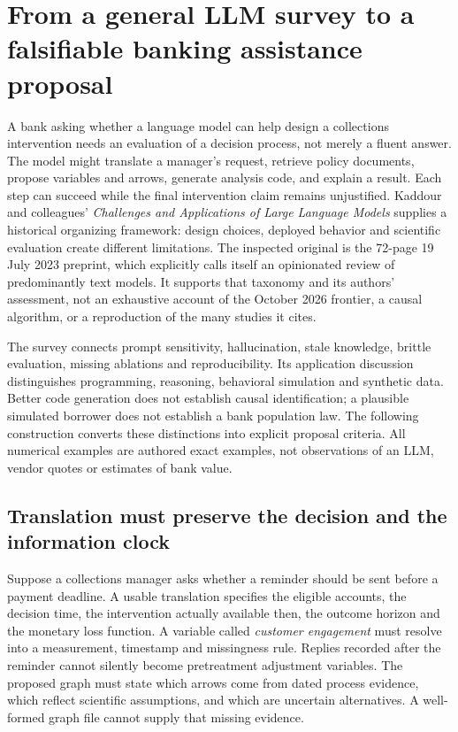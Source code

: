 \section{From a general LLM survey to a falsifiable banking assistance proposal}
\label{sec:exec24-llm-challenges}

A bank asking whether a language model can help design a collections intervention
needs an evaluation of a decision process, not merely a fluent answer. The model
might translate a manager's request, retrieve policy documents, propose variables
and arrows, generate analysis code, and explain a result. Each step can succeed
while the final intervention claim remains unjustified. Kaddour and colleagues'
\emph{Challenges and Applications of Large Language Models} supplies a historical
organizing framework: design choices, deployed behavior and scientific evaluation
create different limitations. The inspected original is the 72-page 19 July 2023
preprint, which explicitly calls itself an opinionated review of predominantly
text models. It supports that taxonomy and its authors' assessment, not an
exhaustive account of the October 2026 frontier, a causal algorithm, or a
reproduction of the many studies it cites.\citep{exec24_llmchallenges_original}

The survey connects prompt sensitivity, hallucination, stale knowledge, brittle
evaluation, missing ablations and reproducibility. Its application discussion
distinguishes programming, reasoning, behavioral simulation and synthetic data.
Better code generation does not establish causal identification; a plausible
simulated borrower does not establish a bank population law. The following
construction converts these distinctions into explicit proposal criteria.
All numerical examples are authored exact examples, not observations of an LLM,
vendor quotes or estimates of bank value.\citep{exec24_llmchallenges_reference}

\subsection{Translation must preserve the decision and the information clock}

Suppose a collections manager asks whether a reminder should be sent before a
payment deadline. A usable translation specifies the eligible accounts, the
decision time, the intervention actually available then, the outcome horizon
and the monetary loss function. A variable called \emph{customer engagement}
must resolve into a measurement, timestamp and missingness rule. Replies recorded
after the reminder cannot silently become pretreatment adjustment variables.
The proposed graph must state which arrows come from dated process evidence,
which reflect scientific assumptions, and which are uncertain alternatives.
A well-formed graph file cannot supply that missing evidence.

